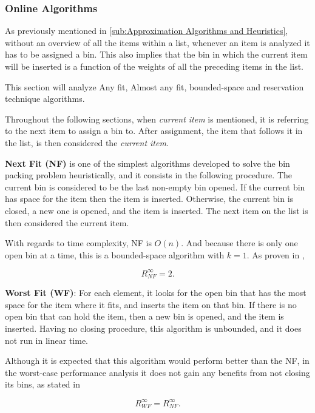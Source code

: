 \subsubsection{Online Algorithms}

As previously mentioned in \ref{sub:Approximation Algorithms and Heuristics}, without an overview of all the items within a list, whenever an item is analyzed it has to be assigned a bin. This also implies that the bin in which the current item will be inserted is a function of the weights of all the preceding items in the list.

This section will analyze Any fit, Almost any fit, bounded-space and reservation technique algorithms.

Throughout the following sections, when \textit{current item} is mentioned, it is referring to the next item to assign a bin to. After assignment, the item that follows it in the list, is then considered the \textit{current item}.

\textbf{Next Fit (NF)} is one of the simplest algorithms developed to solve the bin packing problem heuristically, and it consists in the following procedure. The current bin is considered to be the last non-empty bin opened. If the current bin has space for the item then the item is inserted. Otherwise, the current bin is closed, a new one is opened, and the item is inserted. The next item on the list is then considered the current item.

With regards to time complexity, NF is $O(n)$. And because there is only one open bin at a time, this is a bounded-space algorithm with $k = 1$. As proven in \cite{johnson1973near}, 

\begin{equation}
    R_{NF}^\infty = 2.
\end{equation}

\textbf{Worst Fit (WF)}: For each element, it looks for the open bin that has the most space for the item where it fits, and inserts the item on that bin. If there is no open bin that can hold the item, then a new bin is opened, and the item is inserted. Having no closing procedure, this algorithm is unbounded, and it does not run in linear time.

Although it is expected that this algorithm would perform better than the NF, in the worst-case performance analysis it does not gain any benefits from not closing its bins, as stated in \cite{man1996approximation}

\begin{equation}
    R_{WF}^\infty = R_{NF}^\infty.
\end{equation}

